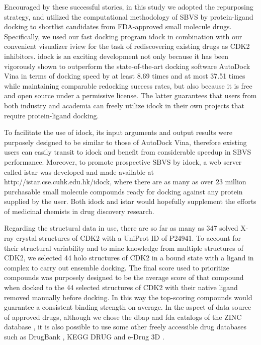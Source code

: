 \documentclass[10pt]{article}
\begin{document}
Encouraged by these successful stories, in this study we adopted the repurposing strategy, and utilized the computational methodology of SBVS by protein-ligand docking to shortlist candidates from FDA-approved small molecule drugs. Specifically, we used our fast docking program idock \cite{1153,1362} in combination with our convenient visualizer iview \cite{1366} for the task of rediscovering existing drugs as CDK2 inhibitors. idock is an exciting development not only because it has been vigorously shown \cite{1362} to outperform the state-of-the-art docking software AutoDock Vina \cite{595} in terms of docking speed by at least 8.69 times and at most 37.51 times while maintaining comparable redocking success rates, but also because it is free and open source under a permissive license. The latter guarantees that users from both industry and academia can freely utilize idock in their own projects that require protein-ligand docking.

To facilitate the use of idock, its input arguments and output results were purposely designed to be similar to those of AutoDock Vina, therefore existing users can easily transit to idock and benefit from considerable speedup in SBVS performance. Moreover, to promote prospective SBVS by idock, a web server called istar \cite{1362} was developed and made available at http://istar.cse.cuhk.edu.hk/idock, where there are as many as over 23 million purchasable small molecule compounds ready for docking against any protein supplied by the user. Both idock \cite{1153} and istar \cite{1362} would hopefully supplement the efforts of medicinal chemists in drug discovery research.

Regarding the structural data in use, there are so far as many as 347 solved X-ray crystal structures of CDK2 with a UniProt ID of P24941. To account for their structural variability and to mine knowledge from multiple structures of CDK2, we selected 44 holo structures of CDK2 in a bound state with a ligand in complex to carry out ensemble docking. The final score used to prioritize compounds was purposely designed to be the average score of that compound when docked to the 44 selected structures of CDK2 with their native ligand removed manually before docking. In this way the top-scoring compounds would guarantee a consistent binding strength on average. In the aspect of data source of approved drugs, although we chose the dbap and fda catalogs of the ZINC database \cite{532,1178}, it is also possible to use some other freely accessible drug databases such as DrugBank \cite{1594}, KEGG DRUG \cite{1595} and e-Drug 3D \cite{1125}.
\end{document}

